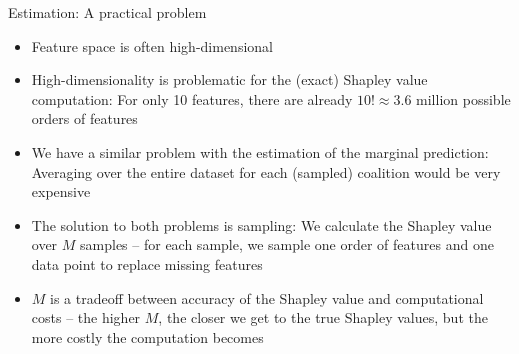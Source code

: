 \documentclass[11pt,compress,t,notes=noshow, aspectratio=169, xcolor=table]{beamer}
\begin{document}
\begin{frame}{Estimation: A practical problem}
  \begin{itemize}
  \itemsep1em
      \item Feature space is often high-dimensional
      \item High-dimensionality is problematic for the (exact) Shapley value computation: For only 10 features, there are already $10! \approx 3.6$ million possible orders of features
      \item We have a similar problem with the estimation of the marginal prediction: Averaging over the entire dataset for each (sampled) coalition would be very expensive
      \item The solution to both problems is sampling: We calculate the Shapley value over $M$ samples -- for each sample, we sample one order of features and one data point to replace missing features
      \item $M$ is a tradeoff between accuracy of the Shapley value and computational costs -- the higher $M$, the closer we get to the true Shapley values, but the more costly the computation becomes
  \end{itemize}
\end{frame}

\newcommand{\xk}{\mathbf{x}^{(k)}}
\end{document}
